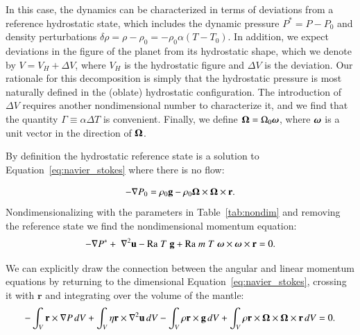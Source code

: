 \documentclass[preprint,12pt,authoryear]{elsarticle}
\newcommand{\mitbf}[1]{\hbox{\mathversion{bold}$#1$}}
\begin{document}
In this case, the dynamics can be characterized in terms of deviations from a reference hydrostatic state, 
which includes the dynamic pressure $P^* = P - P_0$ and density perturbations $\delta \rho = \rho- \rho_0 = - \rho_0 \alpha (T-T_0)$.
In addition, we expect deviations in the figure of the planet from its hydrostatic shape, 
which we denote by $V = V_H + \Delta V$, where $V_H$ is the hydrostatic figure and $\Delta V$ is the deviation. 
Our rationale for this decomposition is simply that the hydrostatic pressure is most naturally defined in the (oblate) hydrostatic configuration. 
The introduction of $\Delta V$ requires another nondimensional number to characterize it, 
and we find that the quantity $\Gamma \equiv \alpha \Delta T$ is convenient.
Finally, we define $\mitbf{\Omega} = \Omega_0 \mitbf{\omega}$, where $\mitbf{\omega}$ is a unit vector in the direction of $\mitbf{\Omega}$.

By definition the hydrostatic reference state is a solution to Equation~\eqref{eq:navier_stokes} where there is no flow:

\begin{equation}
\begin{aligned}
- \nabla P_0 =  \rho_0 \mathbf{g} -  \rho_0 \mitbf{\Omega} \times \mitbf{\Omega} \times \mathbf{r}.
\label{eq:hydrostatic}
\end{aligned}
\end{equation}
Nondimensionalizing with the parameters in Table~\ref{tab:nondim} and removing the reference state we find the nondimensional momentum equation:
\begin{equation}
\begin{aligned}
 - \nabla P^* + \; \nabla^2 \mathbf{u} - \mathrm{Ra} \; T \; \mathbf{g} + \mathrm{Ra} \; m \; T \;{\mitbf{\omega} \times \mitbf{\omega} \times \mathbf{r}} = 0.
\end{aligned}
\end{equation}

We can explicitly draw the connection between the angular and linear momentum equations by returning to the dimensional
Equation~\eqref{eq:navier_stokes}, crossing it with $\mathbf{r}$ and integrating over the volume of the mantle:
\begin{equation}
\begin{aligned}
-\int_V \mathbf{r} \times \nabla P \,dV + \int_V \eta \mathbf{r} \times \nabla^2 \mathbf{u} \,dV - \int_V \rho \mathbf{r} \times \mathbf{g} \,dV 
   + \int_V \rho \mathbf{r} \times \mitbf{\Omega} \times \mitbf{\Omega} \times \mathbf{r}  \,dV &= 0. \\
\end{aligned}
\end{equation}
\end{document}
